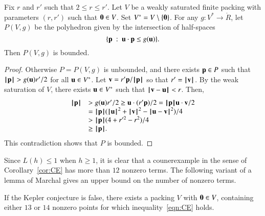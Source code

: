 \begin{lemma}\label{lemma:poly-bounded} 
Fix $r$ and $r'$ such that $2\le r\le r'$.
Let $ V$ be a weakly saturated finite packing with parameters $(r,r')$ 
such that ${\mathbf 0}\in  V$.
Set $ V^*= V\setminus\{{\mathbf 0}\}$.
For any $g: V^*\to\ring{R}$, let $P( V,g)$ be the
polyhedron given by the intersection of half-spaces
\begin{displaymath}
\{{\mathbf p} \ :\   {\mathbf u}\cdot {\mathbf p} \le g( {\mathbf u})\}.
\end{displaymath}
Then $P( V,g)$ is bounded.
\end{lemma}
%

\begin{proof}  Otherwise $P=P( V,g)$ is unbounded, and there exists ${\mathbf p}\in P$ such that
${{\hskip0.1em|\hskip-0.15em|\hskip0.1em}{\mathbf p}{\hskip0.1em|\hskip-0.15em|\hskip0.1em}} > g( {\mathbf u}) r'/2$ for all $ {\mathbf u}\in V^*$.  Let ${\mathbf v} =  r' {\mathbf p}/{{\hskip0.1em|\hskip-0.15em|\hskip0.1em}{\mathbf p}{\hskip0.1em|\hskip-0.15em|\hskip0.1em}}$ so that $r'={{\hskip0.1em|\hskip-0.15em|\hskip0.1em}{\mathbf v}{\hskip0.1em|\hskip-0.15em|\hskip0.1em}}$.  By the weak saturation of $ V$, there exists $ {\mathbf u}\in V^*$ such that ${\hskip0.1em|\hskip-0.15em|\hskip0.1em}{\mathbf v} -  {\mathbf u}{\hskip0.1em|\hskip-0.15em|\hskip0.1em}<r$.    Then,
\begin{displaymath}
\begin{array}{lll}
\normo{\p} &> g( \u) r'/2 \ge  \u\cdot (r' \p)/2 = \normo{\p}  \u\cdot \v /2\\
  &= \normo{\p} (\normo{ \u}^2 + \normo{\v}^2 - \norm{ \u}{\v}^2)/4\\
  &> \normo{\p}(4+r'^2-r^2)/4\\
  &\ge \normo{\p}.
\end{array}
\end{displaymath}
This contradiction shows that $P$ is bounded.
\end{proof}




Since $L(h)\le 1$ when $h\ge1$, it is clear that a counerexample in the sense of Corollary~\ref{cor:CE} has more than $12$ nonzero terms.  The following variant of a lemma of Marchal gives an upper bound on the number of nonzero terms.


\begin{lemma}\label{lemma:13-14}  %
If the Kepler conjecture is false, there exists a packing $ V$ with ${\mathbf 0}\in V$, containing either $13$ or $14$ nonzero points for which inequality~\ref{eqn:CE} holds.
\end{lemma}



